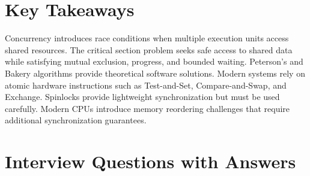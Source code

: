 \section{Key Takeaways}

\begin{keytakeaways}
Concurrency introduces race conditions when multiple execution units access shared resources. The critical section problem seeks safe access to shared data while satisfying mutual exclusion, progress, and bounded waiting. Peterson's and Bakery algorithms provide theoretical software solutions. Modern systems rely on atomic hardware instructions such as Test-and-Set, Compare-and-Swap, and Exchange. Spinlocks provide lightweight synchronization but must be used carefully. Modern CPUs introduce memory reordering challenges that require additional synchronization guarantees.
\end{keytakeaways}

\section{Interview Questions with Answers}

